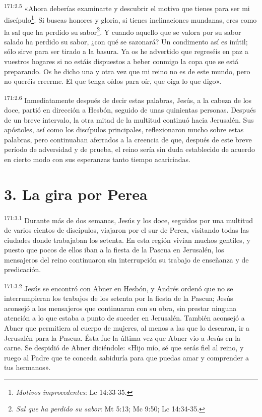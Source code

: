 \par 
\textsuperscript{171:2.5} «Ahora deberías examinarte y descubrir el motivo que tienes para ser mi discípulo\footnote{\textit{Motivos improcedentes}: Lc 14:33-35.}. Si buscas honores y gloria, si tienes inclinaciones mundanas, eres como la sal que ha perdido su sabor\footnote{\textit{Sal que ha perdido su sabor}: Mt 5:13; Mc 9:50; Lc 14:34-35.}. Y cuando aquello que se valora por su sabor salado ha perdido su sabor, ¿con qué se sazonará? Un condimento así es inútil; sólo sirve para ser tirado a la basura. Ya os he advertido que regreséis en paz a vuestros hogares si no estáis dispuestos a beber conmigo la copa que se está preparando. Os he dicho una y otra vez que mi reino no es de este mundo, pero no queréis creerme. El que tenga oídos para oír, que oiga lo que digo».

\par 
\textsuperscript{171:2.6} Inmediatamente después de decir estas palabras, Jesús, a la cabeza de los doce, partió en dirección a Hesbón, seguido de unas quinientas personas. Después de un breve intervalo, la otra mitad de la multitud continuó hacia Jerusalén. Sus apóstoles, así como los discípulos principales, reflexionaron mucho sobre estas palabras, pero continuaban aferrados a la creencia de que, después de este breve período de adversidad y de prueba, el reino sería sin duda establecido de acuerdo en cierto modo con sus esperanzas tanto tiempo acariciadas.

\section*{3. La gira por Perea}
\par 
\textsuperscript{171:3.1} Durante más de dos semanas, Jesús y los doce, seguidos por una multitud de varios cientos de discípulos, viajaron por el sur de Perea, visitando todas las ciudades donde trabajaban los setenta. En esta región vivían muchos gentiles, y puesto que pocos de ellos iban a la fiesta de la Pascua en Jerusalén, los mensajeros del reino continuaron sin interrupción su trabajo de enseñanza y de predicación.

\par 
\textsuperscript{171:3.2} Jesús se encontró con Abner en Hesbón, y Andrés ordenó que no se interrumpieran los trabajos de los setenta por la fiesta de la Pascua; Jesús aconsejó a los mensajeros que continuaran con su obra, sin prestar ninguna atención a lo que estaba a punto de suceder en Jerusalén. También aconsejó a Abner que permitiera al cuerpo de mujeres, al menos a las que lo desearan, ir a Jerusalén para la Pascua. Ésta fue la última vez que Abner vio a Jesús en la carne. Se despidió de Abner diciéndole: «Hijo mío, sé que serás fiel al reino, y ruego al Padre que te conceda sabiduría para que puedas amar y comprender a tus hermanos».


